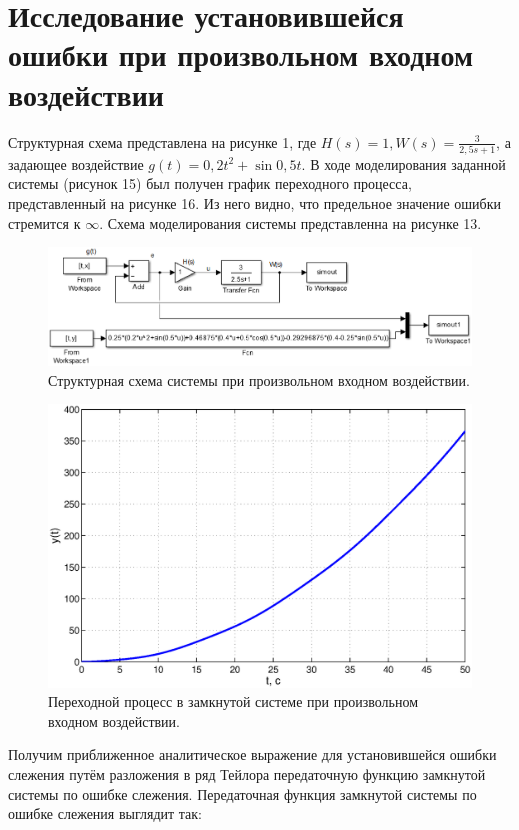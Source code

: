 \documentclass[12pt,a4paper]{article}
\begin{document}
\section*{Исследование установившейся ошибки при произвольном входном воздействии}
 Структурная схема представлена на рисунке 1, где $H(s) = 1, W(s) = \displaystyle{\frac{3}{2,5s + 1}}$, а задающее воздействие $g(t) = 0,2t^2 + \sin{0,5t}$.
 В ходе моделирования заданной системы (рисунок 15) был получен график переходного процесса, представленный на рисунке 16. Из него видно, что предельное значение ошибки стремится к $\infty$. Схема моделирования системы представленна на рисунке 13.
\begin{figure}[H]
    \centering
    \includegraphics[width=1\linewidth]{cxema4.eps}
    \caption{Структурная схема системы при произвольном входном воздействии.}
\end{figure}
\begin{figure}[H]
    \centering
    \includegraphics[width=1\linewidth]{4.1.eps}
    \caption{Переходной процесс в замкнутой системе при произвольном входном воздействии.}
\end{figure}
Получим приближенное аналитическое выражение для установившейся ошибки слежения путём разложения в ряд Тейлора передаточную функцию замкнутой системы по ошибке слежения.
Передаточная функция замкнутой системы по ошибке слежения выглядит так:
\end{document}
